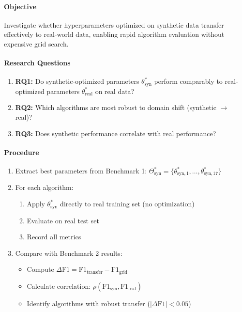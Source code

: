 \documentclass[journal,article,submit,pdftex,moreauthors]{Definitions/mdpi}
\begin{document}
\paragraph{Objective}

Investigate whether hyperparameters optimized on synthetic data transfer effectively to real-world data, enabling rapid algorithm evaluation without expensive grid search.

\paragraph{Research Questions}

\begin{enumerate}
    \item \textbf{RQ1:} Do synthetic-optimized parameters $\theta^*_{\text{syn}}$ perform comparably to real-optimized parameters $\theta^*_{\text{real}}$ on real data?
    \item \textbf{RQ2:} Which algorithms are most robust to domain shift (synthetic $\rightarrow$ real)?
    \item \textbf{RQ3:} Does synthetic performance correlate with real performance?
\end{enumerate}

\paragraph{Procedure}

\begin{enumerate}
    \item Extract best parameters from Benchmark 1: $\Theta^*_{\text{syn}} = \{\theta^*_{\text{syn},1}, \ldots, \theta^*_{\text{syn},17}\}$
    \item For each algorithm:
    \begin{enumerate}
        \item Apply $\theta^*_{\text{syn}}$ directly to real training set (no optimization)
        \item Evaluate on real test set
        \item Record all metrics
    \end{enumerate}
    \item Compare with Benchmark 2 results:
    \begin{itemize}
        \item Compute $\Delta \text{F1} = \text{F1}_{\text{transfer}} - \text{F1}_{\text{grid}}$
        \item Calculate correlation: $\rho(\text{F1}_{\text{syn}}, \text{F1}_{\text{real}})$
        \item Identify algorithms with robust transfer ($|\Delta \text{F1}| < 0.05$)
    \end{itemize}
\end{enumerate}
\end{document}
